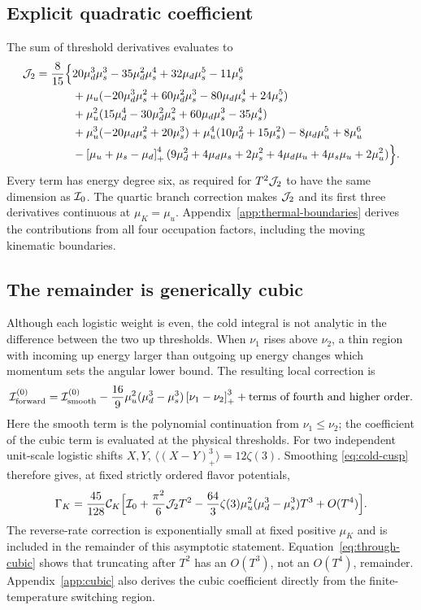 \subsection{Explicit quadratic coefficient}
The sum of threshold derivatives evaluates to
\begin{align}
 \mathcal J_2=\frac{8}{15}\Big\{&
 20\mu_d^3\mu_s^3-35\mu_d^2\mu_s^4+32\mu_d\mu_s^5-11\mu_s^6\notag\\
 &+\mu_u(-20\mu_d^3\mu_s^2+60\mu_d^2\mu_s^3
                  -80\mu_d\mu_s^4+24\mu_s^5)\notag\\
 &+\mu_u^2(15\mu_d^4-30\mu_d^2\mu_s^2
                  +60\mu_d\mu_s^3-35\mu_s^4)\notag\\
 &+\mu_u^3(-20\mu_d\mu_s^2+20\mu_s^3)
   +\mu_u^4(10\mu_d^2+15\mu_s^2)-8\mu_d\mu_u^5+8\mu_u^6\notag\\
 &-\left[\mu_u+\mu_s-\mu_d\right]_+^{4}
 (9\mu_d^2+4\mu_d\mu_s+2\mu_s^2
       +4\mu_d\mu_u+4\mu_s\mu_u+2\mu_u^2)\Big\}.
 \label{eq:thermal-result}
\end{align}
Every term has energy degree six, as required for \(T^2\mathcal J_2\) to have the same dimension as \(\mathcal I_0\).
The quartic branch correction makes \(\mathcal J_2\) and its first three derivatives continuous at \(\mu_K=\mu_u\).
Appendix~\ref{app:thermal-boundaries} derives the contributions from all four occupation factors, including the moving kinematic boundaries.

\subsection{The remainder is generically cubic}
Although each logistic weight is even, the cold integral is not analytic in the difference between the two up thresholds.
When \(\nu_1\) rises above \(\nu_2\), a thin region with incoming up energy larger than outgoing up energy changes which momentum sets the angular lower bound.
The resulting local correction is
\begin{equation}
 \mathcal I^{(0)}_{\rm forward}
 =\mathcal I^{(0)}_{\rm smooth}
 -\frac{16}{9}\mu_u^2(\mu_d^3-\mu_s^3)
       \left[\nu_1-\nu_2\right]_+^{3}
 +\text{terms of fourth and higher order}.
 \label{eq:cold-cusp}
\end{equation}
Here the smooth term is the polynomial continuation from \(\nu_1\leq\nu_2\); the coefficient of the cubic term is evaluated at the physical thresholds.
For two independent unit-scale logistic shifts \(X,Y\), \(\langle(X-Y)_+^3\rangle=12\zeta(3)\).
Smoothing \cref{eq:cold-cusp} therefore gives, at fixed strictly ordered flavor potentials,
\begin{align}
 \Gamma_K=\frac{45}{128}\mathcal C_K\Big[
 \mathcal I_0+\frac{\pi^2}{6}\mathcal J_2 T^2
 -\frac{64}{3}\zeta(3)\mu_u^2(\mu_d^3-\mu_s^3)T^3
 +O(T^4)\Big].
 \label{eq:through-cubic}
\end{align}
The reverse-rate correction is exponentially small at fixed positive \(\mu_K\) and is included in the remainder of this asymptotic statement.
Equation~\eqref{eq:through-cubic} shows that truncating after \(T^2\) has an \(O(T^3)\), not an \(O(T^4)\), remainder.
Appendix~\ref{app:cubic} also derives the cubic coefficient directly from the finite-temperature switching region.

